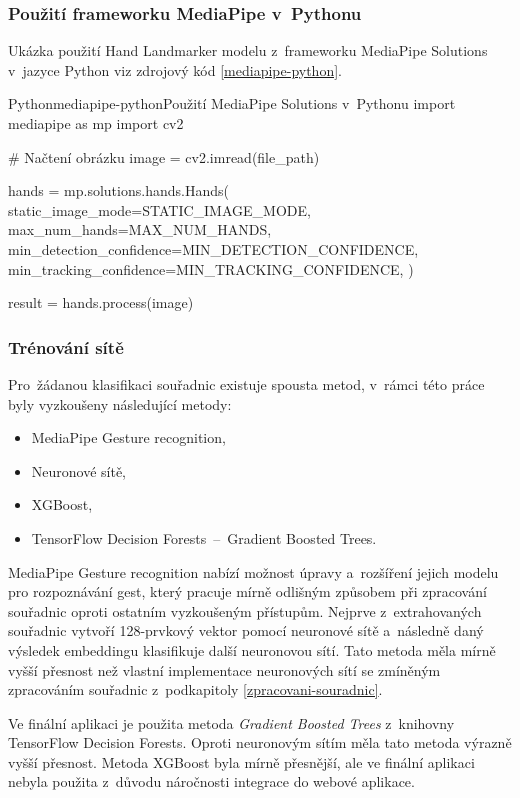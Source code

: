 \documentclass[
  master,
  program=ainfvs,
  biblatex,
  figures=true,
  tables=false,
  sourcecodes=true,
  glossaries,
  index
]{kidiplom}
\begin{document}
        \subsubsection{Použití frameworku MediaPipe v~Pythonu}
        Ukázka použití Hand Landmarker modelu z~frameworku MediaPipe Solutions v~jazyce Python viz zdrojový kód \ref{mediapipe-python}.
        
        \begin{kicode}{Python}{mediapipe-python}{Použití MediaPipe Solutions v~Pythonu}
import mediapipe as mp
import cv2

# Načtení obrázku
image = cv2.imread(file_path)

hands = mp.solutions.hands.Hands(
    static_image_mode=STATIC_IMAGE_MODE,
    max_num_hands=MAX_NUM_HANDS,
    min_detection_confidence=MIN_DETECTION_CONFIDENCE,
    min_tracking_confidence=MIN_TRACKING_CONFIDENCE,
)

result = hands.process(image)
        \end{kicode}
        
        \subsubsection{Trénování sítě}
           Pro~žádanou klasifikaci souřadnic existuje spousta metod, v~rámci této práce byly vyzkoušeny následující metody:

           \begin{itemize}
                \item MediaPipe Gesture recognition,
                \item Neuronové sítě,
                \item XGBoost,
                \item TensorFlow Decision Forests~--~Gradient Boosted Trees.
            \end{itemize}

        MediaPipe Gesture recognition nabízí možnost úpravy a~rozšíření jejich modelu pro rozpoznávání gest, který pracuje mírně odlišným způsobem při zpracování souřadnic oproti ostatním vyzkoušeným přístupům. Nejprve z~extrahovaných souřadnic vytvoří 128-prvkový vektor pomocí neuronové sítě a~následně daný výsledek embeddingu klasifikuje další neuronovou sítí. Tato metoda měla mírně vyšší přesnost než vlastní implementace neuronových sítí se zmíněným zpracováním souřadnic z~podkapitoly \ref{zpracovani-souradnic}.
    
       Ve finální aplikaci je použita metoda \emph{Gradient Boosted Trees} z~knihovny TensorFlow Decision Forests. Oproti neuronovým sítím měla tato metoda výrazně vyšší přesnost. Metoda XGBoost byla mírně přesnější, ale ve finální aplikaci nebyla použita z~důvodu náročnosti integrace do webové aplikace. 
        
\end{document}
